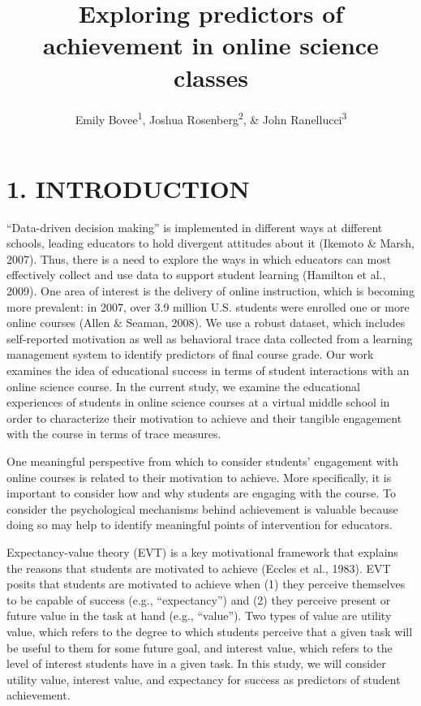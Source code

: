 \documentclass[acmart]{apa6}
\title{Exploring predictors of achievement in online science classes}
\author{Emily Bovee\textsuperscript{1}, Joshua Rosenberg\textsuperscript{2}, \& John Ranellucci\textsuperscript{3}}
\affiliation{
    \vspace{0.5cm}
          \textsuperscript{1} Michigan State University\\
          \textsuperscript{2} University of Tennessee, Knoxville\\
          \textsuperscript{3} Hunter College  }
\theoremstyle{definition}
\theoremstyle{definition}
\theoremstyle{definition}
\theoremstyle{remark}
\begin{document}
\maketitle

\setcounter{secnumdepth}{0}



\section{1. INTRODUCTION}\label{introduction}

\enquote{Data-driven decision making} is implemented in different ways
at different schools, leading educators to hold divergent attitudes
about it (Ikemoto \& Marsh, 2007). Thus, there is a need to explore the
ways in which educators can most effectively collect and use data to
support student learning (Hamilton et al., 2009). One area of interest
is the delivery of online instruction, which is becoming more prevalent:
in 2007, over 3.9 million U.S. students were enrolled one or more online
courses (Allen \& Seaman, 2008). We use a robust dataset, which includes
self-reported motivation as well as behavioral trace data collected from
a learning management system to identify predictors of final course
grade. Our work examines the idea of educational success in terms of
student interactions with an online science course. In the current
study, we examine the educational experiences of students in online
science courses at a virtual middle school in order to characterize
their motivation to achieve and their tangible engagement with the
course in terms of trace measures.

One meaningful perspective from which to consider students' engagement
with online courses is related to their motivation to achieve. More
specifically, it is important to consider how and why students are
engaging with the course. To consider the psychological mechanisms
behind achievement is valuable because doing so may help to identify
meaningful points of intervention for educators.

Expectancy-value theory (EVT) is a key motivational framework that
explains the reasons that students are motivated to achieve (Eccles et
al., 1983). EVT posits that students are motivated to achieve when (1)
they perceive themselves to be capable of success (e.g.,
\enquote{expectancy}) and (2) they perceive present or future value in
the task at hand (e.g., \enquote{value}). Two types of value are utility
value, which refers to the degree to which students perceive that a
given task will be useful to them for some future goal, and interest
value, which refers to the level of interest students have in a given
task. In this study, we will consider utility value, interest value, and
expectancy for success as predictors of student achievement.
\end{document}
